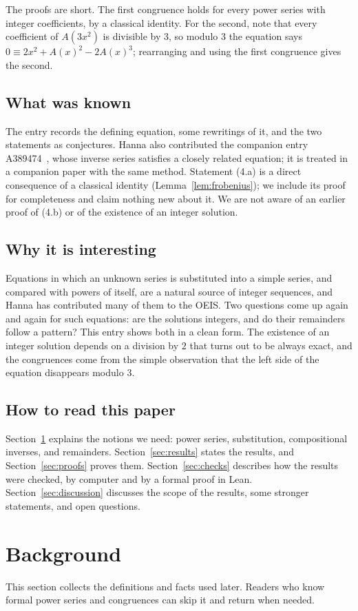 \documentclass[11pt,a4paper]{article}
\theoremstyle{definition}
\theoremstyle{remark}
\begin{document}
The proofs are short. The first congruence holds for every power series with integer coefficients, by a classical
identity. For the second, note that every coefficient of $A(3x^2)$ is divisible by $3$, so modulo $3$ the equation says
$0\equiv2x^2+A(x)^2-2A(x)^3$; rearranging and using the first congruence gives the second.

\subsection{What was known}
The entry records the defining equation, some rewritings of it, and the two statements as conjectures. Hanna also
contributed the companion entry A389474~\cite{oeisother}, whose inverse series satisfies a closely related equation; it
is treated in a companion paper with the same method. Statement (4.a) is a direct consequence of a classical identity
(Lemma~\ref{lem:frobenius}); we include its proof for completeness and claim nothing new about it. We are not aware of
an earlier proof of (4.b) or of the existence of an integer solution.

\subsection{Why it is interesting}
Equations in which an unknown series is substituted into a simple series, and compared with powers of itself,
are a natural source of integer sequences, and Hanna has contributed many of them to the OEIS. Two questions come up
again and again for such equations: are the solutions integers, and do their remainders follow a pattern? This entry
shows both in a clean form. The existence of an integer solution depends on a division by $2$ that turns out to be
always exact, and the congruences come from the simple observation that the left side of the equation disappears
modulo $3$.

\subsection{How to read this paper}
Section~\ref{sec:background} explains the notions we need: power series, substitution, compositional inverses, and
remainders. Section~\ref{sec:results} states the results, and Section~\ref{sec:proofs} proves them.
Section~\ref{sec:checks} describes how the results were checked, by computer and by a formal proof in Lean.
Section~\ref{sec:discussion} discusses the scope of the results, some stronger statements, and open questions.
\section{Background}\label{sec:background}
This section collects the definitions and facts used later. Readers who know formal power series and congruences can skip it and return when needed.
\end{document}
